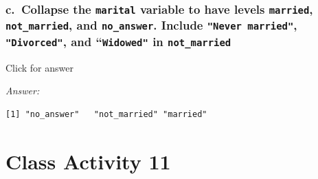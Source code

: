 \documentclass[
]{book}
\newenvironment{Shaded}{\begin{snugshade}}{\end{snugshade}}
\newcommand{\AttributeTok}[1]{\textcolor[rgb]{0.77,0.63,0.00}{#1}}
\newcommand{\CommentTok}[1]{\textcolor[rgb]{0.56,0.35,0.01}{\textit{#1}}}
\newcommand{\FunctionTok}[1]{\textcolor[rgb]{0.00,0.00,0.00}{#1}}
\newcommand{\NormalTok}[1]{#1}
\newcommand{\OtherTok}[1]{\textcolor[rgb]{0.56,0.35,0.01}{#1}}
\newcommand{\SpecialCharTok}[1]{\textcolor[rgb]{0.00,0.00,0.00}{#1}}
\newcommand{\StringTok}[1]{\textcolor[rgb]{0.31,0.60,0.02}{#1}}
\begin{document}
\hypertarget{c.-collapse-the-marital-variable-to-have-levels-married-not_married-and-no_answer.-include-never-married-divorced-and-widowed-in-not_married}{%
\subsection{\texorpdfstring{c.~Collapse the \texttt{marital} variable to have levels \texttt{married}, \texttt{not\_married}, and \texttt{no\_answer}. Include \texttt{"Never\ married"}, \texttt{"Divorced"}, and ``\texttt{Widowed"} in \texttt{not\_married}}{c.~Collapse the marital variable to have levels married, not\_married, and no\_answer. Include "Never married", "Divorced", and ``Widowed" in not\_married}}\label{c.-collapse-the-marital-variable-to-have-levels-married-not_married-and-no_answer.-include-never-married-divorced-and-widowed-in-not_married}}

Click for answer

\emph{Answer:}

\begin{Shaded}
\end{Shaded}

\begin{verbatim}
[1] "no_answer"   "not_married" "married"    
\end{verbatim}

\hypertarget{class-activity-11}{%
\chapter{Class Activity 11}\label{class-activity-11}}
\end{document}

